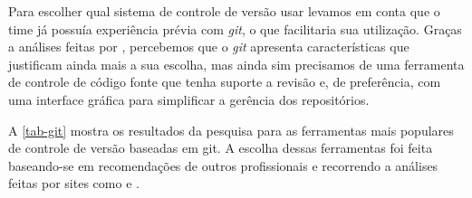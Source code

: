\documentclass[
	12pt,				%
	openright,			%
	oneside,			%
	a4paper,			%
	english,			%
	french,				%
	spanish,			%
	brazil,				%
	]{abntex2}
\begin{document}
Para escolher qual sistema de controle de versão usar levamos em conta que o time já possuía experiência prévia com \textit{git}, o que facilitaria sua utilização. Graças a análises feitas por , percebemos que o \textit{git} apresenta características que justificam ainda mais a sua escolha, mas ainda sim precisamos de uma ferramenta de controle de código fonte que tenha suporte a revisão e, de preferência, com uma interface gráfica para simplificar a gerência dos repositórios.

A \autoref{tab-git} mostra os resultados da pesquisa para as ferramentas mais populares de controle de versão baseadas em git. A escolha dessas ferramentas foi feita baseando-se em recomendações de outros profissionais e recorrendo a análises feitas por sites como  e .
\end{document}
